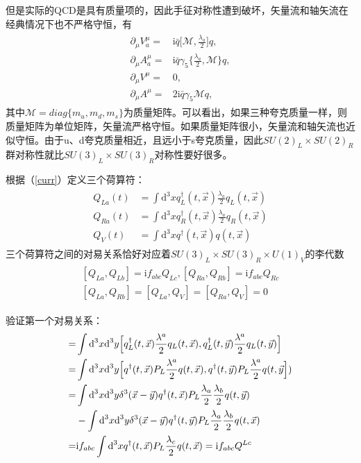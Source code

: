 \documentclass[aps,tightenlines,16pt]{ctexart}
\numberwithin{equation}{section}
\begin{document}
但是实际的QCD是具有质量项的，因此手征对称性遭到破坏，矢量流和轴矢流在经典情况下也不严格守恒，有
\begin{align}
   \begin{aligned}
   \partial_{\mu} V^{\mu}_a = &\mbox{i}\bar{q}\Big[\mathcal{M},\frac{\lambda_a}{2}\Big]q,\\
   \partial_{\mu} A^{\mu}_a = &\mbox{i}\bar{q}\gamma_5\Big\{\frac{\lambda_a}{2},\mathcal{M}\Big\}q,\\
   \partial_{\mu}V^{\mu}=& 0,\\
   \partial_{\mu}A^{\mu}=&2\mbox{i}\bar{q}\gamma_5\mathcal{M}q,
   \end{aligned}
\end{align}
其中$\mathcal{M}=diag\{m_u,m_d,m_s\}$为质量矩阵。可以看出，如果三种夸克质量一样，则质量矩阵为单位矩阵，矢量流严格守恒。如果质量矩阵很小，矢量流和轴矢流也近似守恒。由于u、d夸克质量相近，且远小于s夸克质量，因此$SU(2)_L\times SU(2)_R$群对称性就比$SU(3)_L\times SU(3)_R$对称性要好很多。

根据（\ref{curr}）定义三个荷算符：
\begin{align}
   \begin{aligned}
      Q_{La}(t) &= \int \mbox{d}^3x q_L^{\dagger}(t,\vec{x}) \frac{\lambda_a}{2}q_L(t,\vec{x})\\
      Q_{Ra}(t) &= \int \mbox{d}^3x q_R^{\dagger}(t,\vec{x}) \frac{\lambda_a}{2}q_R(t,\vec{x})\\
      Q_{V}(t) &= \int \mbox{d}^3x q^{\dagger}(t,\vec{x}) q(t,\vec{x})
   \end{aligned}   
\end{align}
三个荷算符之间的对易关系恰好对应着$SU(3)_L\times SU(3)_R\times U(1)_V$的李代数
\begin{align}
   \begin{aligned}
      [Q_{La},Q_{Lb}]=\mbox{i}f_{abc}Q_{Lc}, [Q_{Ra},Q_{Rb}]=\mbox{i}f_{abc}Q_{Rc}\\
      [Q_{La},Q_{Rb}]=[Q_{La},Q_V]=[Q_{Ra},Q_V]=0
   \end{aligned}
\end{align}

验证第一个对易关系：
\begin{align*}
   [Q_{La},Q_{Lb}] =& \int \mbox{d}^3x \mbox{d}^3y \Bigl[q_L^{\dagger}(t,\vec{x})\frac{\lambda^a}{2}q_L(t,\vec{x}),q_L^{\dagger}(t,\vec{y})\frac{\lambda^a}{2}q_L(t,\vec{y})\Bigr] \\
   =&\int \mbox{d}^3x \mbox{d}^3y \Bigl[q^{\dagger}(t,\vec{x})P_L\frac{\lambda^a}{2}q(t,\vec{x}),q^{\dagger}(t,\vec{y})P_L\frac{\lambda^a}{2}q(t,\vec{y}\Bigr])\\
   =&\int \mbox{d}^3x \mbox{d}^3y \delta^3(\vec{x}-\vec{y})q^{\dagger}(t,\vec{x})P_L\frac{\lambda_a}{2}\frac{\lambda_b}{2}q(t,\vec{y})\\
   &-\int \mbox{d}^3x \mbox{d}^3y \delta^3(\vec{x}-\vec{y})q^{\dagger}(t,\vec{y})P_L\frac{\lambda_a}{2}\frac{\lambda_b}{2}q(t,\vec{x})\\
   =& \mbox{i}f_{abc}\int \mbox{d}^3xq^{\dagger}(t,\vec{x})P_L\frac{\lambda_c}{2}q(t,\vec{x})=\mbox{i}f_{abc}Q^{Lc}
\end{align*}
\end{document}
